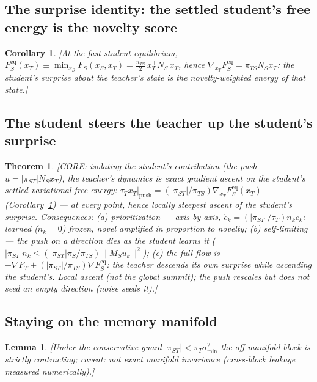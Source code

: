 \documentclass[10pt,letterpaper]{article}
\theoremstyle{plain}
\newtheorem{theorem}{Theorem}
\newtheorem{lemma}{Lemma}
\newtheorem{corollary}{Corollary}
\theoremstyle{remark}
\begin{document}
\subsection{The surprise identity: the settled student's free energy is the novelty score}
\begin{corollary}\label{cor:surprise}
\textit{[At the fast-student equilibrium,
$F_S^{\mathrm{eq}}(x_T)\equiv\min_{x_S}F_S(x_S,x_T)=\tfrac{\pi_{TS}}{2}\,x_T^\top N_S\,x_T$,
hence $\nabla_{x_T}F_S^{\mathrm{eq}}=\pi_{TS}N_S x_T$: the student's surprise about the
teacher's state is the novelty-weighted energy of that state.]}
\end{corollary}

\subsection{The student steers the teacher up the student's surprise}
\begin{theorem}\label{thm:prioritized}
\textit{[CORE: isolating the student's contribution (the push $u=|\pi_{ST}|N_S x_T$),
the teacher's dynamics is exact gradient ascent on the student's settled variational
free energy: $\tau_T\dot x_T|_{\mathrm{push}}=(|\pi_{ST}|/\pi_{TS})\nabla_{x_T}
F_S^{\mathrm{eq}}(x_T)$ (Corollary~\ref{cor:surprise}) --- at every point, hence
locally steepest ascent of the student's surprise. Consequences: (a) prioritization ---
axis by axis, $\dot c_k=(|\pi_{ST}|/\tau_T)n_k c_k$: learned ($n_k=0$) frozen, novel
amplified in proportion to novelty; (b) self-limiting --- the push on a direction dies
as the student learns it ($|\pi_{ST}|n_k\le(|\pi_{ST}|\pi_S/\pi_{TS})\|M_S u_k\|^2$);
(c) the full flow is $-\nabla F_T+(|\pi_{ST}|/\pi_{TS})\nabla F_S^{\mathrm{eq}}$: the
teacher descends its own surprise while ascending the student's. Local ascent (not the
global summit); the push rescales but does not seed an empty direction (noise seeds it).]}
\end{theorem}

\subsection{Staying on the memory manifold}
\begin{lemma}\label{lem:normal}
\textit{[Under the conservative guard $|\pi_{ST}|<\pi_T\sigma_{\min}^2$ the
off-manifold block is strictly contracting; caveat: not exact manifold
invariance (cross-block leakage measured numerically).]}
\end{lemma}
\end{document}
